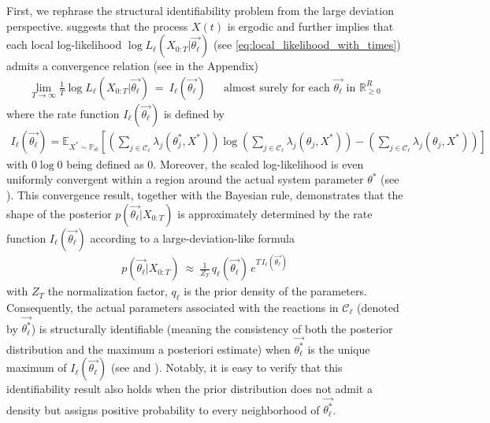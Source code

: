 \documentclass[pdflatex,sn-mathphys-num]{sn-jnl}%
\theoremstyle{thmstyleone}%
\theoremstyle{thmstyletwo}%
\theoremstyle{thmstylethree}%
\begin{document}
First, we rephrase the structural identifiability problem from the large deviation perspective.
 suggests that the process $X(t)$ is ergodic and further implies that each local log-likelihood $\log L_\ell\left(X_{0:T}\big|\overrightarrow{\theta_\ell}\right)$ (see \eqref{eq:local_likelihood_with_times}) admits a convergence relation (see  in the Appendix)
\begin{align}\label{eq. convergence of the log likelihood}
    \lim_{T\to\infty} \frac{1}{T} \log L_\ell\left(X_{0:T}\big|\overrightarrow{\theta_\ell}\right)
    ~=~
    I_{\ell}\left(\overrightarrow{\theta_\ell}\right) && \text{almost surely for each $\overrightarrow{\theta_\ell}$ in $\mathbb R^{R}_{\geq 0}$}
\end{align}
where the rate function $I_{\ell}\left(\overrightarrow{\theta_\ell}\right)$ is defined by 
\begin{align}\label{eq I(theta)}
        I_{\ell}\left(\overrightarrow{\theta_\ell}\right)
        = 
        \mathbb E_{X^*\sim \mathbb P_\text{st}}\left[
            \left(\sum_{j\in\mathcal C_\ell}
            \lambda_{j}(\theta^*_j,X^*)
            \right)
            \log
            \left(
                \sum_{j\in\mathcal C_\ell}
                \lambda_{j}(\theta_j,X^*)
            \right)
            - 
            \left(\sum_{j\in\mathcal C_\ell}
            \lambda_{j}(\theta_j,X^*)
            \right)
        \right]
\end{align}
with $0\log0$ being defined as 0.
Moreover, the scaled log-likelihood is even uniformly convergent within a region around the actual system parameter $\theta^*$ (see ).
This convergence result, together with the Bayesian rule, demonstrates that the shape of the posterior $p(\overrightarrow{\theta_\ell}|X_{0:T})$ is approximately determined by the rate function $I_{\ell}\left(\overrightarrow{\theta_\ell}\right)$ according to a large-deviation-like formula 
\begin{align*}
    p\left(\overrightarrow{\theta_\ell} \big|X_{0:T}\right) ~\approx~
    \frac{1}{Z_T}\,q_{\ell}\left(\overrightarrow{\theta_\ell}\right)\,
    e^{T\, I_{\ell}\left(\overrightarrow{\theta_\ell}\right)}
\end{align*}
with $Z_T$ the normalization factor, $q_{\ell}$ is the prior density of the parameters. 
Consequently, the actual parameters associated with the reactions in $\mathcal C_\ell$ (denoted by $\overrightarrow{\theta^*_\ell}$) is structurally identifiable (meaning the consistency of both the posterior distribution and the maximum a posteriori estimate) when $\overrightarrow{\theta^*_\ell}$ is the unique maximum of $I_{\ell}\left(\overrightarrow{\theta_\ell}\right)$  (see  and ).
Notably, it is easy to verify that this identifiability result also holds when the prior distribution does not admit a density but assigns positive probability to every neighborhood of $\overrightarrow{\theta^*_\ell}$.
\end{document}
